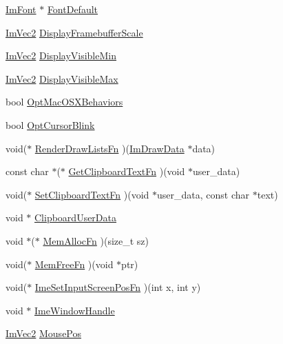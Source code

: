 \begin{DoxyCompactItemize}
\item 
\mbox{\hyperlink{struct_im_font}{Im\+Font}} $\ast$ \mbox{\hyperlink{struct_im_gui_i_o_a11016e4aefa603523bce61315b66bf00}{Font\+Default}}
\item 
\mbox{\hyperlink{struct_im_vec2}{Im\+Vec2}} \mbox{\hyperlink{struct_im_gui_i_o_a703cad6bd4c9e8972d056116104d27e8}{Display\+Framebuffer\+Scale}}
\item 
\mbox{\hyperlink{struct_im_vec2}{Im\+Vec2}} \mbox{\hyperlink{struct_im_gui_i_o_a45b49309f2f8765622962ed7f286674d}{Display\+Visible\+Min}}
\item 
\mbox{\hyperlink{struct_im_vec2}{Im\+Vec2}} \mbox{\hyperlink{struct_im_gui_i_o_a9bb46e8da3da68b83c66219beb861cb1}{Display\+Visible\+Max}}
\item 
bool \mbox{\hyperlink{struct_im_gui_i_o_a99ffac55fc01f11166e8e92ca9ebda98}{Opt\+Mac\+O\+S\+X\+Behaviors}}
\item 
bool \mbox{\hyperlink{struct_im_gui_i_o_a676ccbf84e205effc5a023e8d5adc6eb}{Opt\+Cursor\+Blink}}
\item 
void($\ast$ \mbox{\hyperlink{struct_im_gui_i_o_ae16a9f25f36fe9706d8a33fb128e538a}{Render\+Draw\+Lists\+Fn}} )(\mbox{\hyperlink{struct_im_draw_data}{Im\+Draw\+Data}} $\ast$data)
\item 
const char $\ast$($\ast$ \mbox{\hyperlink{struct_im_gui_i_o_ab7face2b2efef720a22a7fb2143d415c}{Get\+Clipboard\+Text\+Fn}} )(void $\ast$user\+\_\+data)
\item 
void($\ast$ \mbox{\hyperlink{struct_im_gui_i_o_a1ee9c0763df33f7f3a9819235ce85078}{Set\+Clipboard\+Text\+Fn}} )(void $\ast$user\+\_\+data, const char $\ast$text)
\item 
void $\ast$ \mbox{\hyperlink{struct_im_gui_i_o_a162d9da988e8985df05d262640f2f91c}{Clipboard\+User\+Data}}
\item 
void $\ast$($\ast$ \mbox{\hyperlink{struct_im_gui_i_o_a352f6f0770974ee173f84d99d9e50a6e}{Mem\+Alloc\+Fn}} )(size\+\_\+t sz)
\item 
void($\ast$ \mbox{\hyperlink{struct_im_gui_i_o_adb56df4e96ab8a9f1aefe8dd474ba0f5}{Mem\+Free\+Fn}} )(void $\ast$ptr)
\item 
void($\ast$ \mbox{\hyperlink{struct_im_gui_i_o_ac59559342608fbdeb14778a4fd57c301}{Ime\+Set\+Input\+Screen\+Pos\+Fn}} )(int x, int y)
\item 
void $\ast$ \mbox{\hyperlink{struct_im_gui_i_o_a8baa252c4f76764eb866b920f227cfa2}{Ime\+Window\+Handle}}
\item 
\mbox{\hyperlink{struct_im_vec2}{Im\+Vec2}} \mbox{\hyperlink{struct_im_gui_i_o_ad2e9e547cb4d2abe8e7d27407efffeb8}{Mouse\+Pos}}

\end{DoxyCompactItemize}
